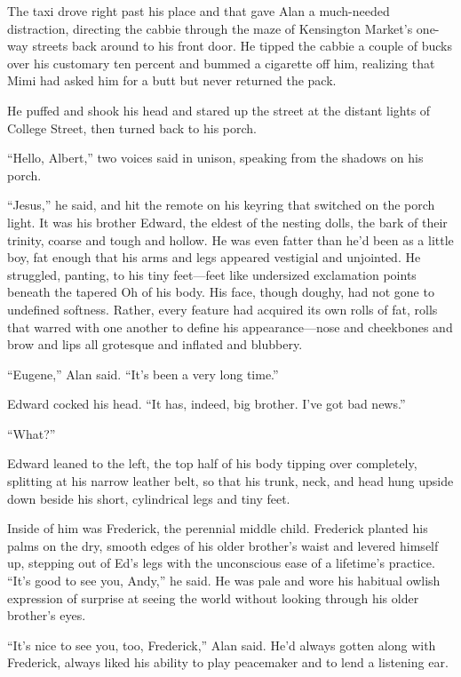 \documentclass{article}
\begin{document}
The taxi drove right past his place and that gave Alan a much-needed
distraction, directing the cabbie through the maze of Kensington
Market's one-way streets back around to his front door.  He tipped the
cabbie a couple of bucks over his customary ten percent and bummed a
cigarette off him, realizing that Mimi had asked him for a butt but
never returned the pack.

He puffed and shook his head and stared up the street at the distant
lights of College Street, then turned back to his porch.

``Hello, Albert,'' two voices said in unison, speaking from the
shadows on his porch.

``Jesus,'' he said, and hit the remote on his keyring that switched on
the porch light.  It was his brother Edward, the eldest of the nesting
dolls, the bark of their trinity, coarse and tough and hollow.  He was
even fatter than he'd been as a little boy, fat enough that his arms
and legs appeared vestigial and unjointed.  He struggled, panting, to
his tiny feet---feet like undersized exclamation points beneath the
tapered Oh of his body.  His face, though doughy, had not gone to
undefined softness.  Rather, every feature had acquired its own rolls
of fat, rolls that warred with one another to define his
appearance---nose and cheekbones and brow and lips all grotesque and
inflated and blubbery.

``Eugene,'' Alan said.  ``It's been a very long time.''

Edward cocked his head.  ``It has, indeed, big brother.  I've got bad
news.''

``What?''

Edward leaned to the left, the top half of his body tipping over
completely, splitting at his narrow leather belt, so that his trunk,
neck, and head hung upside down beside his short, cylindrical legs and
tiny feet.

Inside of him was Frederick, the perennial middle child.  Frederick
planted his palms on the dry, smooth edges of his older brother's
waist and levered himself up, stepping out of Ed's legs with the
unconscious ease of a lifetime's practice.  ``It's good to see you,
Andy,'' he said.  He was pale and wore his habitual owlish expression
of surprise at seeing the world without looking through his older
brother's eyes.

``It's nice to see you, too, Frederick,'' Alan said.  He'd always
gotten along with Frederick, always liked his ability to play
peacemaker and to lend a listening ear.
\end{document}
